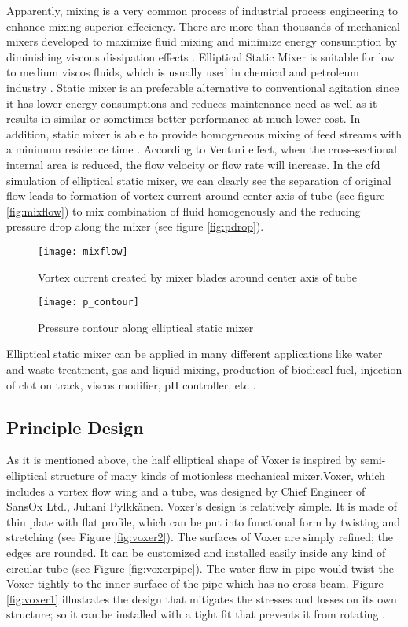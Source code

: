 Apparently, mixing is a very common process of industrial process engineering to enhance mixing superior effeciency. There are more than thousands of mechanical mixers developed to maximize fluid mixing and minimize energy consumption by diminishing viscous dissipation effects \cite{mixing:article}. Elliptical Static Mixer is suitable for low to medium \gls{viscos} fluids, which is usually used in chemical and petroleum industry \cite{static:web}. 
Static mixer is an preferable alternative to conventional agitation since it has lower energy consumptions and reduces maintenance need as well as it results in similar or sometimes better performance at much lower cost. In addition, static mixer is able to provide homogeneous mixing of feed streams with a minimum residence time \cite{thakur:article}. According to Venturi effect, when the cross-sectional internal area is reduced, the flow velocity or flow rate will increase. 
In the \gls{cfd} simulation of elliptical static mixer, we can clearly see the separation of original flow leads to formation of vortex current around center axis of tube (see figure \vref{fig:mixflow}) to mix combination of fluid homogenously and the reducing pressure drop along the mixer (see figure \vref{fig:pdrop}).

\begin{figure}[h]
  \centering
  \texttt{[image: mixflow]}
  \caption{ Vortex current created by mixer blades around center axis of tube\cite{cfd:article}}
  \label{fig:mixflow}
\end{figure}
\begin{figure}[h]
  \centering
  \texttt{[image: p\_contour]}
  \caption{ Pressure contour along elliptical static mixer\cite{cfd:article}}
  \label{fig:pdrop}
\end{figure}

Elliptical static mixer can be applied in many different applications like water and waste treatment, gas and liquid mixing, production of biodiesel fuel, injection of clot on track, \gls{viscos} modifier, pH controller, etc \cite{static:web}. 

\subsection{Principle Design}

As it is mentioned above, the half elliptical shape of Voxer is inspired by semi-elliptical structure of many kinds of motionless mechanical mixer.Voxer, which includes a vortex flow wing and a tube, was designed by Chief Engineer of SansOx Ltd., Juhani Pylkkänen. Voxer's design is relatively simple. It is made of thin plate with flat profile, which can be put into functional form by twisting and stretching (see Figure \vref{fig:voxer2}). The surfaces of Voxer are simply refined; the edges are rounded. It can be customized and installed easily inside any kind of circular tube (see Figure \vref{fig:voxerpipe}). The water flow in pipe would twist the Voxer tightly to the inner surface of the pipe which has no cross beam. Figure \vref{fig:voxer1} illustrates the design that mitigates the stresses and losses on its own structure; so it can be installed with a tight fit that prevents it from rotating \cite{voxer:article}.


